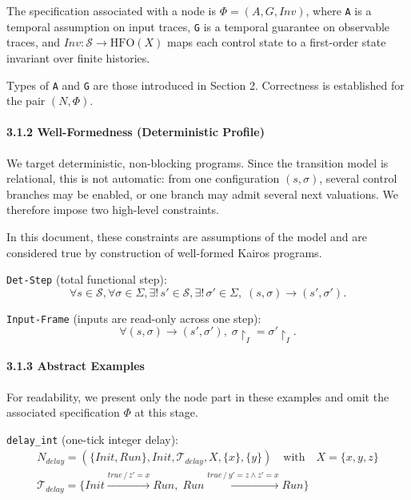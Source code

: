 \documentclass[
]{article}
\begin{document}
The specification associated with a node is \(\Phi=(A,G,Inv)\), where
\texttt{A} is a temporal assumption on input traces, \texttt{G} is a
temporal guarantee on observable traces, and
\(Inv:\mathcal S\to\mathrm{HFO}(X)\) maps each control state to a
first-order state invariant over finite histories.

Types of \texttt{A} and \texttt{G} are those introduced in Section 2.
Correctness is established for the pair \((N,\Phi)\).

\paragraph{3.1.2 Well-Formedness (Deterministic
Profile)}\label{well-formedness-deterministic-profile}

We target deterministic, non-blocking programs. Since the transition
model is relational, this is not automatic: from one configuration
\((s,\sigma)\), several control branches may be enabled, or one branch
may admit several next valuations. We therefore impose two high-level
constraints.

In this document, these constraints are assumptions of the model and are
considered true by construction of well-formed Kairos programs.

\texttt{Det-Step} (total functional step): \[
\forall s\in\mathcal S,\forall \sigma\in\Sigma,\exists!\,s'\in\mathcal S,\exists!\,\sigma'\in\Sigma,\;
(s,\sigma)\to(s',\sigma').
\]

\texttt{Input-Frame} (inputs are read-only across one step): \[
\forall (s,\sigma)\to(s',\sigma'),\;
\sigma\!\upharpoonright_I=\sigma'\!\upharpoonright_I.
\]

\paragraph{3.1.3 Abstract Examples}\label{abstract-examples}

For readability, we present only the node part in these examples and
omit the associated specification \(\Phi\) at this stage.

\texttt{delay\_int} (one-tick integer delay): \[
\begin{array}{l}
N_{delay}=(\{Init,Run\},Init,\mathcal T_{delay},X,\{x\},\{y\})\quad\text{with}\quad X=\{x,y,z\}\\
\mathcal T_{delay}=\{Init\xrightarrow{true\,/\,z'=x}Run,\;Run\xrightarrow{true\,/\,y'=z\land z'=x}Run\}
\end{array}
\]
\end{document}
